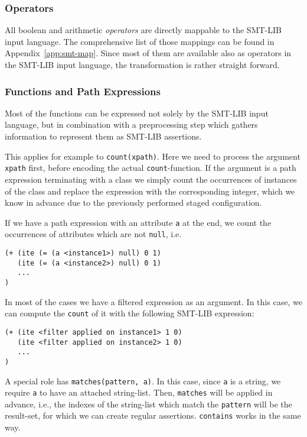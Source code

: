 \subsubsection*{Operators}

All boolean and arithmetic \emph{operators} are directly mappable to the SMT-LIB input language. The comprehensive list of those mappings can be found in Appendix~\ref{app:smt-map}. Since most of them are available also as operators in the SMT-LIB input language, the transformation is rather straight forward.

\subsubsection*{Functions and Path Expressions}

Most of the functions can be expressed not solely by the SMT-LIB input language, but in combination with a preprocessing step which gathers information to represent them as SMT-LIB assertions.

This applies for example to \verb|count(xpath)|. Here we need to process the argument \verb|xpath| first, before encoding the actual \verb|count|-function. If the argument is a path expression terminating with a class we simply count the occurrences of instances of the class and replace the expression with the corresponding integer, which we know in advance due to the previously performed staged configuration.

If we have a path expression with an attribute \verb|a| at the end, we count the occurrences of attributes which are not \verb|null|, i.e.

\begin{verbatim}
(+ (ite (= (a <instance1>) null) 0 1)
   (ite (= (a <instance2>) null) 0 1)
   ...
)
\end{verbatim}

In most of the cases we have a filtered expression as an argument. In this case, we can compute the \verb|count| of it with the following SMT-LIB expression:
\begin{verbatim}
(+ (ite <filter applied on instance1> 1 0)
   (ite <filter applied on instance2> 1 0)
   ...
)
\end{verbatim}

A special role has \verb|matches(pattern, a)|. In this case, since \verb|a| is a string, we require \verb|a| to have an attached string-list. Then, \verb|matches| will be applied in advance, i.e., the indexes of the string-list which match the \verb|pattern| will be the result-set, for which we can create regular assertions. \verb|contains| works in the same way.

